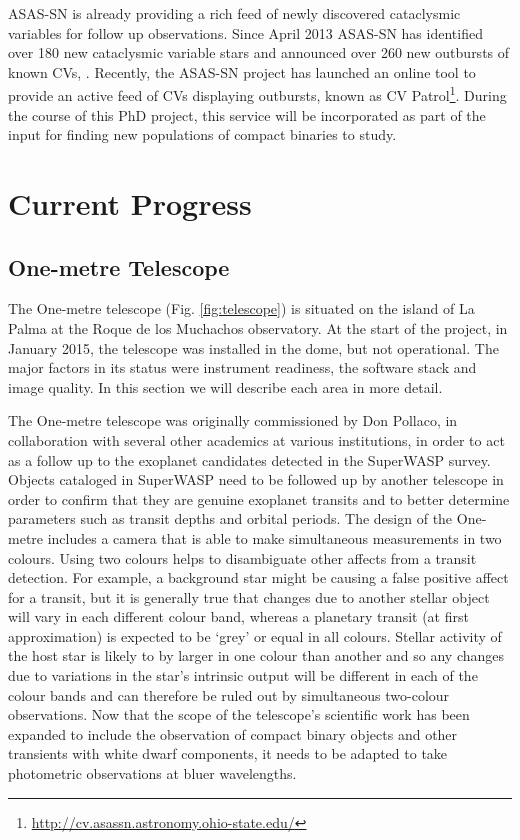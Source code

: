 \documentclass[a4paper,fleqn,usenatbib]{mnras}
\begin{document}
ASAS-SN is already providing a rich feed of newly discovered cataclysmic variables for follow up observations. Since April 2013 ASAS-SN has identified over 180 new cataclysmic variable stars and announced over 260 new outbursts of known CVs, \citep{Davis2015}. Recently, the ASAS-SN project has launched an online tool to provide an active feed of CVs displaying outbursts, known as CV Patrol\footnote{\url{http://cv.asassn.astronomy.ohio-state.edu/}}.  During the course of this PhD project, this service will be incorporated as part of the input for finding new populations of compact binaries to study.  

\section{Current Progress}

\subsection{One-metre Telescope}
The One-metre telescope (Fig. \ref{fig:telescope}) is situated on the island of La Palma at the Roque de los Muchachos observatory. At the start of the project, in January 2015, the telescope was installed in the dome, but not operational. The major factors in its status were instrument readiness, the software stack and image quality. In this section we will describe each area in more detail. 

The One-metre telescope was originally commissioned by Don Pollaco, in collaboration with several other academics at various institutions, in order to act as a follow up to the exoplanet candidates detected in the SuperWASP \citep{PollaccoSuperWASP} survey. Objects cataloged in SuperWASP need to be followed up by another telescope in order to confirm that they are genuine exoplanet transits and to better determine parameters such as transit depths and orbital periods. The design of the One-metre includes a camera that is able to make simultaneous measurements in two colours. Using two colours helps to disambiguate other affects from a transit detection. For example, a background star might be causing a false positive affect for a transit, but it is generally true that changes due to another stellar object will vary in each different colour band, whereas a planetary transit (at first approximation) is expected to be `grey' or equal in all colours. Stellar activity of the host star is likely to by larger in one colour than another and so any changes due to variations in the star's intrinsic output will be different in each of the colour bands and can therefore be ruled out by simultaneous two-colour observations. Now that the scope of the telescope's scientific work has been expanded to include the observation of compact binary objects and other transients with white dwarf components, it needs to be adapted to take photometric observations at bluer wavelengths. 
\end{document}
